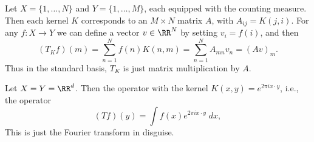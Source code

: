 \begin{example}
  Let $X = \{ 1, \dots, N \}$ and $Y = \{ 1, \dots, M \}$, each equipped with the counting measure. Then each kernel $K$ corresponds to an $M \times N$ matrix $A$, with $A_{ij} = K(j,i)$. For any $f: X \to Y$ we can define a vector $v \in \RR^N$ by setting $v_i = f(i)$, and then
  \[ (T_K f)(m) = \sum_{n = 1}^N f(n) K(n,m) = \sum_{n = 1}^N A_{mn} v_n = (Av)_m. \]
  Thus in the standard basis, $T_K$ is just matrix multiplication by $A$.
\end{example}

\begin{example}
  Let $X = Y = \RR^d$. Then the operator with the kernel $K(x,y) = e^{2 \pi i x \cdot y}$, i.e., the operator
  \[ (T f)(y) = \int f(x) e^{2 \pi i x \cdot y}\; dx, \]
  This is just the Fourier transform in disguise.
\end{example}

